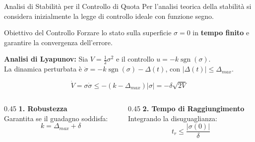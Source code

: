 \documentclass[aspectratio=169]{beamer} %
\begin{document}
\begin{frame}{Analisi di Stabilità per il Controllo di Quota}
    Per l'analisi teorica della stabilità si considera inizialmente
    la legge di controllo ideale con funzione segno.
    \begin{block}{Obiettivo del Controllo}
        Forzare lo stato sulla superficie $\sigma = 0$ in \textbf{tempo finito} e garantire la convergenza dell'errore.
    \end{block}

    \textbf{Analisi di Lyapunov:}
    Sia $V = \frac{1}{2}\sigma^2$ e il controllo $u = -k \operatorname{sgn}(\sigma)$.\\
    \vspace{0.05cm}
    La dinamica perturbata è $\dot{\sigma} = -k \operatorname{sgn}(\sigma) - \Delta(t)$, con $|\Delta(t)| \le \Delta_{max}$.
    
    \begin{equation}
        \dot{V} = \sigma\dot{\sigma} \le -(k - \Delta_{max})|\sigma| = -\delta \sqrt{2V}
    \end{equation}

    \vspace{0.2cm}
    \begin{columns}[t]
        \begin{column}{0.45\textwidth}
            \textbf{1. Robustezza} \\
            Garantita se il guadagno soddisfa:
            \begin{equation}
                k = \Delta_{max} + \delta
            \end{equation}
        \end{column}
        \begin{column}{0.45\textwidth}
            \textbf{2. Tempo di Raggiungimento} \\
            Integrando la disuguaglianza:
            \begin{equation}
                t_r \le \frac{|\sigma(0)|}{\delta}
            \end{equation}
        \end{column}
    \end{columns}
\end{frame}

\end{document}
